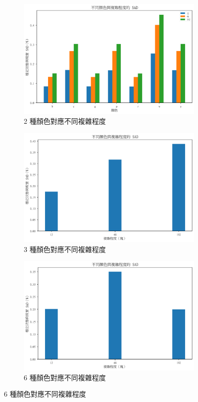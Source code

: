 \documentclass[12pt]{article}
\begin{document}
\begin{figure}[htbp]
  \centering
  \begin{subfigure}[b]{0.9\textwidth}
    \centering
    \includegraphics[width=\textwidth]{img/OutputImg/_Color_2.png}
    \caption{2 種顏色對應不同複雜程度}
  \end{subfigure}

  \begin{subfigure}[b]{0.45\textwidth}
    \centering
    \includegraphics[width=\textwidth]{img/OutputImg/_Color_3.png}
    \caption{3 種顏色對應不同複雜程度}
  \end{subfigure}
  \begin{subfigure}[b]{0.45\textwidth}
    \centering
    \includegraphics[width=\textwidth]{img/OutputImg/_Color_6.png}
    \caption{6 種顏色對應不同複雜程度}
  \end{subfigure}


\end{figure}
\end{document}
